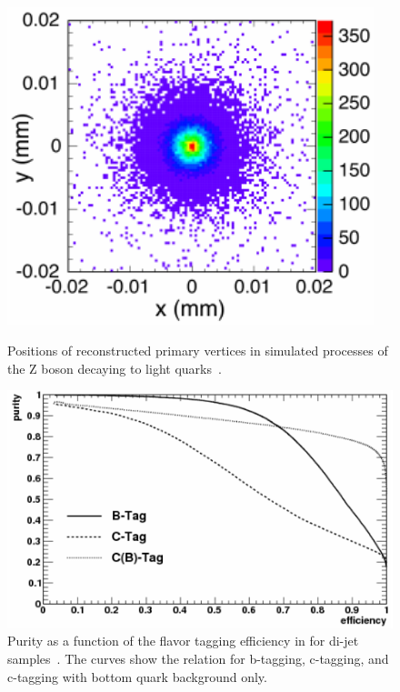 \begin{figure}[!h]
\centering
 \begin{minipage}[t]{0.44\textwidth}
 \centering
\includegraphics[width=0.95\textwidth]{Figures/Vertex_resolution.pdf}
\caption[\sid vertex resolution]{Positions of reconstructed primary vertices in simulated processes of the Z boson decaying to light quarks~\cite[p. 148]{TDR4}.}
\label{fig:vertex_res}
\end{minipage}
\hfill
\begin{minipage}[t]{0.55\textwidth}
\centering
\includegraphics[width=\textwidth]{Figures/flavor_tagging_eff.pdf}
\caption[Flavor tagging efficiency in \sid]{Purity as a function of the flavor tagging efficiency in \sid for di-jet samples~\cite[p. 99]{LOI}.
The curves show the relation for b-tagging, c-tagging, and c-tagging with bottom quark background only.}
\label{fig:tagging}
\end{minipage}
\end{figure}

